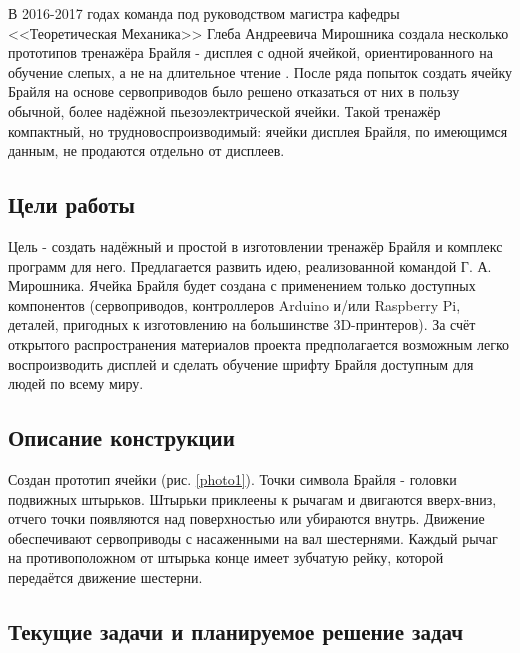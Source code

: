 \documentclass[a4paper,12pt]{article} %
\begin{document}
В 2016-2017 годах команда под руководством магистра кафедры <<Теоретическая Механика>> Глеба Андреевича Мирошника создала несколько прототипов тренажёра Брайля - дисплея с одной ячейкой, ориентированного на обучение слепых, а не на длительное чтение \cite{gleb}. После ряда попыток создать ячейку Брайля на основе сервоприводов было решено отказаться от них в пользу обычной, более надёжной пьезоэлектрической ячейки. Такой тренажёр компактный, но трудновоспроизводимый: ячейки дисплея Брайля, по имеющимся данным, не продаются отдельно от дисплеев.

\subsection{Цели работы}
Цель - создать надёжный и простой в изготовлении тренажёр Брайля и комплекс программ для него. Предлагается развить идею, реализованной командой Г. А. Мирошника. Ячейка Брайля будет создана с применением только доступных компонентов (сервоприводов, контроллеров Arduino и/или Raspberry Pi, деталей, пригодных к изготовлению на большинстве 3D-принтеров). За счёт открытого распространения материалов проекта предполагается возможным легко воспроизводить дисплей и сделать обучение шрифту Брайля доступным для людей по всему миру.

\subsection{Описание конструкции}
Создан прототип ячейки (рис. \ref{photo1}). Точки символа Брайля - головки подвижных штырьков. Штырьки приклеены к рычагам и двигаются вверх-вниз, отчего точки появляются над поверхностью или убираются внутрь. Движение обеспечивают сервоприводы с насаженными на вал шестернями. Каждый рычаг на противоположном от штырька конце имеет зубчатую рейку, которой передаётся движение шестерни.


\subsection{Текущие задачи и планируемое решение задач}
\end{document}
